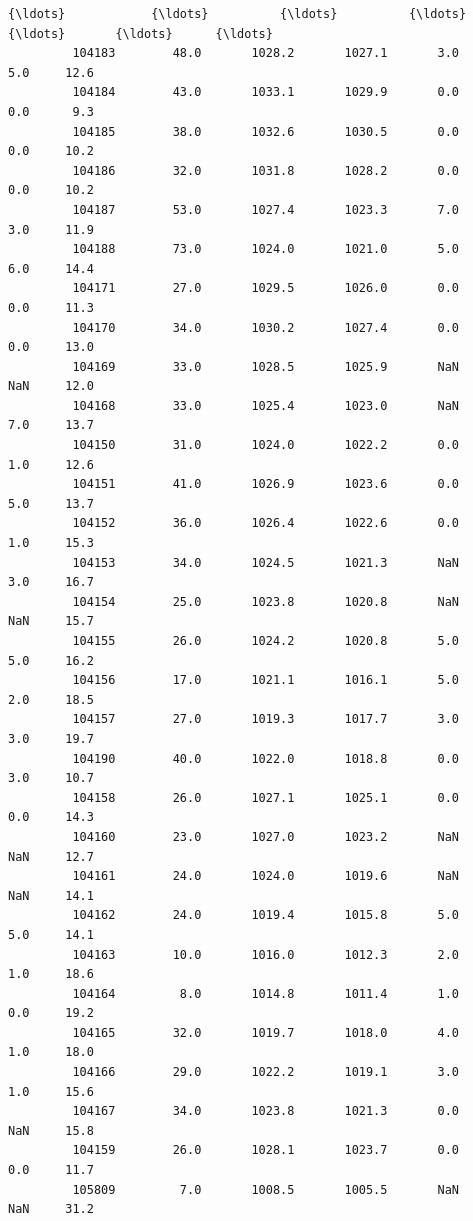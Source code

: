 \documentclass[11pt]{article}
\begin{document}
\begin{Verbatim}[commandchars=\\\{\}]
         {\ldots}            {\ldots}          {\ldots}          {\ldots}       {\ldots}       {\ldots}      {\ldots}   
         104183        48.0       1028.2       1027.1       3.0       5.0     12.6   
         104184        43.0       1033.1       1029.9       0.0       0.0      9.3   
         104185        38.0       1032.6       1030.5       0.0       0.0     10.2   
         104186        32.0       1031.8       1028.2       0.0       0.0     10.2   
         104187        53.0       1027.4       1023.3       7.0       3.0     11.9   
         104188        73.0       1024.0       1021.0       5.0       6.0     14.4   
         104171        27.0       1029.5       1026.0       0.0       0.0     11.3   
         104170        34.0       1030.2       1027.4       0.0       0.0     13.0   
         104169        33.0       1028.5       1025.9       NaN       NaN     12.0   
         104168        33.0       1025.4       1023.0       NaN       7.0     13.7   
         104150        31.0       1024.0       1022.2       0.0       1.0     12.6   
         104151        41.0       1026.9       1023.6       0.0       5.0     13.7   
         104152        36.0       1026.4       1022.6       0.0       1.0     15.3   
         104153        34.0       1024.5       1021.3       NaN       3.0     16.7   
         104154        25.0       1023.8       1020.8       NaN       NaN     15.7   
         104155        26.0       1024.2       1020.8       5.0       5.0     16.2   
         104156        17.0       1021.1       1016.1       5.0       2.0     18.5   
         104157        27.0       1019.3       1017.7       3.0       3.0     19.7   
         104190        40.0       1022.0       1018.8       0.0       3.0     10.7   
         104158        26.0       1027.1       1025.1       0.0       0.0     14.3   
         104160        23.0       1027.0       1023.2       NaN       NaN     12.7   
         104161        24.0       1024.0       1019.6       NaN       NaN     14.1   
         104162        24.0       1019.4       1015.8       5.0       5.0     14.1   
         104163        10.0       1016.0       1012.3       2.0       1.0     18.6   
         104164         8.0       1014.8       1011.4       1.0       0.0     19.2   
         104165        32.0       1019.7       1018.0       4.0       1.0     18.0   
         104166        29.0       1022.2       1019.1       3.0       1.0     15.6   
         104167        34.0       1023.8       1021.3       0.0       NaN     15.8   
         104159        26.0       1028.1       1023.7       0.0       0.0     11.7   
         105809         7.0       1008.5       1005.5       NaN       NaN     31.2   
         

\end{Verbatim}
\end{document}
